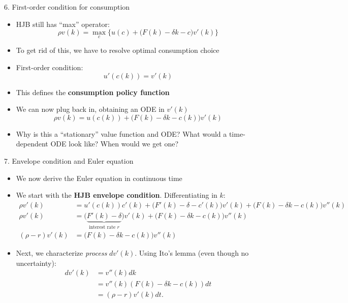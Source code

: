 \documentclass[11pt, aspectratio=169]{beamer}
\begin{document}
\begin{frame}{6. First-order condition for consumption}
\begin{itemize}
\item HJB still has ``max'' operator:
\begin{equation*}
	\rho v(k) = \max_c \Big\{ u(c) + \Big( F(k) - \delta k - c \Big) v'(k) \Big\}
\end{equation*}

\item To get rid of this, we have to resolve optimal consumption choice

\item First-order condition:
\begin{equation*}
	u'(c(k)) = v'(k)
\end{equation*}

\item This defines the \textbf{consumption policy function}

\item We can now plug back in, obtaining an ODE in $v'(k)$
\begin{equation*}
	\rho v(k) = u(c(k)) + \Big( F(k) - \delta k - c(k) \Big) v'(k)
\end{equation*}

\item Why is this a “stationary” value function and ODE? What would a time-dependent ODE look like? When would we get one?
\end{itemize}
\end{frame}



\begin{frame}{7. Envelope condition and Euler equation}

{\small
\begin{itemize}
\item We now derive the Euler equation in continuous time

\item We start with the \textbf{HJB envelope condition}. Differentiating in $k$:
\begin{align*}
	\rho v'(k) &= u'(c(k)) c'(k) + \Big( F'(k) - \delta - c'(k) \Big) v'(k) + \Big( F(k) - \delta k - c(k) \Big) v''(k) \\
	\rho v'(k) &= \Big( \underbrace{ F'(k) - \delta}_\text{interest rate $r$} \Big) v'(k) + \Big( F(k) - \delta k - c(k) \Big) v''(k) \\
	(\rho - r) v'(k) &= \Big( F(k) - \delta k - c(k) \Big) v''(k)
\end{align*}

\item Next, we characterize \textit{process} $d v'(k)$. Using Ito's lemma (even though no uncertainty):
\begin{align*}
	d v'(k) &= v''(k) dk \\
	&= v''(k) (F(k) - \delta k - c(k)) dt \\
	&= (\rho - r) v'(k) dt.
\end{align*}
\end{itemize}
}
\end{frame}
\end{document}
